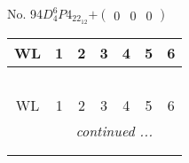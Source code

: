 \documentclass[fleqn,9pt,landscape]{jsarticle}
\begin{document}
\newpage
No. 94\quad$D_{4}^{6}$\quad$P4_22_12$\quad[ tetragonal ]\quad$+\begin{pmatrix} 0 & 0 & 0 \end{pmatrix}$
\begin{center}
\renewcommand{\arraystretch}{1.2}
\begin{longtable}{ccccccc}
 \hline \hline
WL & 1 & 2 & 3 & 4 & 5 & 6 \\ \hline \endfirsthead

\multicolumn{6}{l}{\tablename\ \thetable{}} \\
 \hline \hline
WL & 1 & 2 & 3 & 4 & 5 & 6 \\ \hline \endhead

 \hline \hline
\multicolumn{6}{r}{\footnotesize\it continued ...} \\ \endfoot

 \hline \hline
\multicolumn{6}{r}{} \\ \endlastfoot


\end{longtable}
\end{center}
\end{document}
